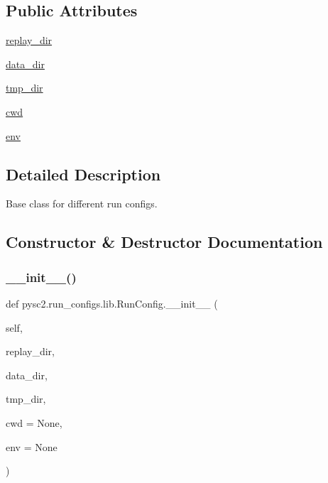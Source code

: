 \subsection*{Public Attributes}
\begin{DoxyCompactItemize}
\item 
\mbox{\hyperlink{classpysc2_1_1run__configs_1_1lib_1_1_run_config_aca6d18d30df342636c175478332b6aa3}{replay\+\_\+dir}}
\item 
\mbox{\hyperlink{classpysc2_1_1run__configs_1_1lib_1_1_run_config_aab93dda31495e5968f79bdf77e139710}{data\+\_\+dir}}
\item 
\mbox{\hyperlink{classpysc2_1_1run__configs_1_1lib_1_1_run_config_ab335f1c1061e8b70ef0c1ecf8834d4a8}{tmp\+\_\+dir}}
\item 
\mbox{\hyperlink{classpysc2_1_1run__configs_1_1lib_1_1_run_config_af8bd9eeb877d8de7ac75b455799d88bf}{cwd}}
\item 
\mbox{\hyperlink{classpysc2_1_1run__configs_1_1lib_1_1_run_config_aae2166085e6fd820345e8af02743b7aa}{env}}
\end{DoxyCompactItemize}


\subsection{Detailed Description}
\begin{DoxyVerb}Base class for different run configs.\end{DoxyVerb}
 

\subsection{Constructor \& Destructor Documentation}
\mbox{\label{classpysc2_1_1run__configs_1_1lib_1_1_run_config_abd1454befc5a4343a64b39c25ab20698}} 
\subsubsection{\texorpdfstring{\+\_\+\+\_\+init\+\_\+\+\_\+()}{\_\_init\_\_()}}
{\footnotesize\ttfamily def pysc2.\+run\+\_\+configs.\+lib.\+Run\+Config.\+\_\+\+\_\+init\+\_\+\+\_\+ (\begin{DoxyParamCaption}\item[{}]{self,  }\item[{}]{replay\+\_\+dir,  }\item[{}]{data\+\_\+dir,  }\item[{}]{tmp\+\_\+dir,  }\item[{}]{cwd = {\ttfamily None},  }\item[{}]{env = {\ttfamily None} }\end{DoxyParamCaption})}

